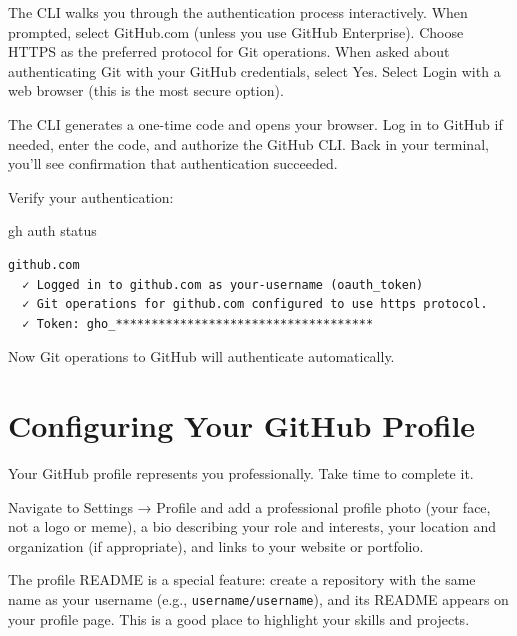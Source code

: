 \documentclass[
  letterpaper,
  DIV=11,
  numbers=noendperiod]{scrreprt}
\newenvironment{Shaded}{\begin{snugshade}}{\end{snugshade}}
\newcommand{\ExtensionTok}[1]{\textcolor[rgb]{0.00,0.23,0.31}{#1}}
\newcommand{\NormalTok}[1]{\textcolor[rgb]{0.00,0.23,0.31}{#1}}
\begin{document}
The CLI walks you through the authentication process interactively. When
prompted, select GitHub.com (unless you use GitHub Enterprise). Choose
HTTPS as the preferred protocol for Git operations. When asked about
authenticating Git with your GitHub credentials, select Yes. Select
Login with a web browser (this is the most secure option).

The CLI generates a one-time code and opens your browser. Log in to
GitHub if needed, enter the code, and authorize the GitHub CLI. Back in
your terminal, you'll see confirmation that authentication succeeded.

Verify your authentication:

\begin{codelisting}

\caption{\texttt{terminal}}

\begin{Shaded}
\begin{Highlighting}[]
\ExtensionTok{gh}\NormalTok{ auth status}
\end{Highlighting}
\end{Shaded}

\end{codelisting}

\begin{verbatim}
github.com
  ✓ Logged in to github.com as your-username (oauth_token)
  ✓ Git operations for github.com configured to use https protocol.
  ✓ Token: gho_************************************
\end{verbatim}

Now Git operations to GitHub will authenticate automatically.

\section{Configuring Your GitHub
Profile}\label{configuring-your-github-profile}

Your GitHub profile represents you professionally. Take time to complete
it.

Navigate to Settings → Profile and add a professional profile photo
(your face, not a logo or meme), a bio describing your role and
interests, your location and organization (if appropriate), and links to
your website or portfolio.

The profile README is a special feature: create a repository with the
same name as your username (e.g., \texttt{username/username}), and its
README appears on your profile page. This is a good place to highlight
your skills and projects.
\end{document}
